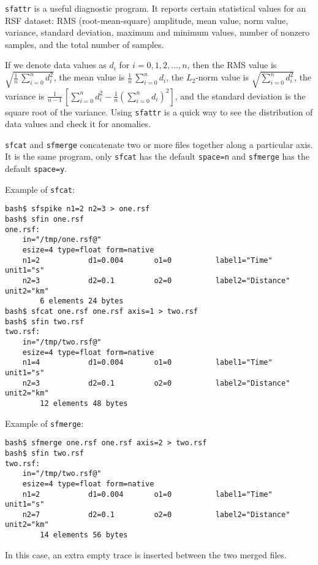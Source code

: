 \noindent\doublebox{\parbox{\textwidth}{

}}

\texttt{sfattr} is a useful diagnostic program. It reports certain
statistical values for an RSF dataset: RMS (root-mean-square)
amplitude, mean value, norm value, variance, standard deviation,
maximum and minimum values, number of nonzero samples, and the total
number of samples.

If we denote data values as $d_i$ for $i=0,1,2,\ldots,n$, then the RMS
value is $\sqrt{\frac{1}{n}\,\sum\limits_{i=0}^n d_i^2}$, the mean
value is $\frac{1}{n}\,\sum\limits_{i=0}^n d_i$, the $L_2$-norm value
is $\sqrt{\sum\limits_{i=0}^n d_i^2}$, the variance is
$\frac{1}{n-1}\,\left[\sum\limits_{i=0}^n d_i^2 - \frac{1}{n}\left(\sum\limits_{i=0}^n d_i\right)^2\right]$, and the standard
deviation is the square root of the variance. Using \texttt{sfattr}
is a quick way to see the distribution of data values and check it for
anomalies.

\noindent\doublebox{\parbox{\textwidth}{

}}

\texttt{sfcat} and \texttt{sfmerge} concatenate two or more files
together along a particular axis. It is the same program, only
\texttt{sfcat} has the default \texttt{space=n} and \texttt{sfmerge}
has the default \texttt{space=y}.

Example of \texttt{sfcat}:
\begin{verbatim}
bash$ sfspike n1=2 n2=3 > one.rsf
bash$ sfin one.rsf
one.rsf:
    in="/tmp/one.rsf@"
    esize=4 type=float form=native
    n1=2           d1=0.004       o1=0          label1="Time" unit1="s"
    n2=3           d2=0.1         o2=0          label2="Distance" unit2="km"
        6 elements 24 bytes
bash$ sfcat one.rsf one.rsf axis=1 > two.rsf
bash$ sfin two.rsf
two.rsf:
    in="/tmp/two.rsf@"
    esize=4 type=float form=native
    n1=4           d1=0.004       o1=0          label1="Time" unit1="s"
    n2=3           d2=0.1         o2=0          label2="Distance" unit2="km"
        12 elements 48 bytes
\end{verbatim}

Example of \texttt{sfmerge}:
\begin{verbatim}
bash$ sfmerge one.rsf one.rsf axis=2 > two.rsf
bash$ sfin two.rsf
two.rsf:
    in="/tmp/two.rsf@"
    esize=4 type=float form=native
    n1=2           d1=0.004       o1=0          label1="Time" unit1="s"
    n2=7           d2=0.1         o2=0          label2="Distance" unit2="km"
        14 elements 56 bytes
\end{verbatim}
In this case, an extra empty trace is inserted between the two merged files.

